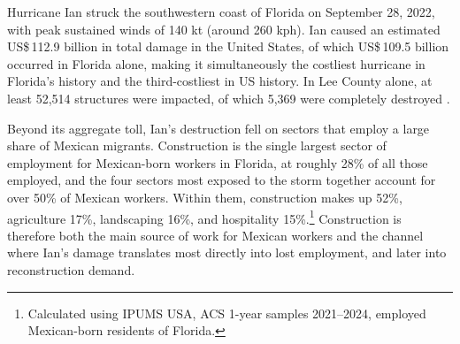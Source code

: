 Hurricane Ian struck the southwestern coast of Florida on September 28, 2022, with peak sustained winds of 140 kt (around 260 kph). Ian caused an estimated US\$\,112.9 billion in total damage in the United States, of which US\$\,109.5 billion occurred in Florida alone, making it simultaneously the costliest hurricane in Florida's history and the third-costliest in US history. In Lee County alone, at least 52,514 structures were impacted, of which 5,369 were completely destroyed \parencite{nhc_ian_2026}.
\par
Beyond its aggregate toll, Ian's destruction fell on sectors that employ a large share of Mexican migrants. Construction is the single largest sector of employment for Mexican-born workers in Florida, at roughly 28\% of all those employed, and the four sectors most exposed to the storm together account for over 50\% of Mexican workers. Within them, construction makes up 52\%, agriculture 17\%, landscaping 16\%, and hospitality 15\%.\footnote{Calculated using IPUMS USA, ACS 1-year samples 2021--2024, employed Mexican-born residents of Florida.} Construction is therefore both the main source of work for Mexican workers and the channel where Ian's damage translates most directly into lost employment, and later into reconstruction demand. 
\par
